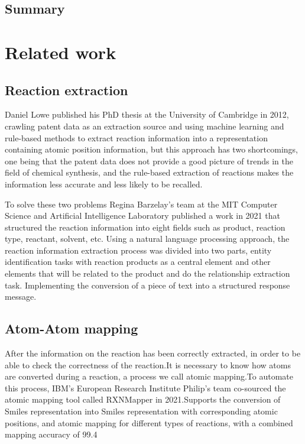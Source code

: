 \documentclass[%
 aip,
 jmp,%
 amsmath,amssymb,
 reprint,%
]{revtex4-2}
\begin{document}
\subsection{Summary}

\section{Related work}

\subsection{Reaction extraction}
Daniel Lowe published his PhD thesis at the University of Cambridge in 2012, crawling patent data as an extraction source and using 
machine learning and rule-based methods to extract reaction information into a representation containing atomic position information, 
but this approach has two shortcomings, one being that the patent data does not provide a good picture of trends in the field of chemical 
synthesis, and the rule-based extraction of reactions makes the information less accurate and less likely to be recalled.

To solve these two problems Regina Barzelay's team at the MIT Computer Science and Artificial Intelligence Laboratory published a work 
in 2021 that structured the reaction information into eight fields such as product, reaction type, reactant, solvent, etc. Using a 
natural language processing approach, the reaction information extraction process was divided into two parts, entity identification tasks
with reaction products as a central element and other elements that will be related to the product and do the relationship extraction task.
Implementing the conversion of a piece of text into a structured response message.


\subsection{Atom-Atom mapping}
After the information on the reaction has been correctly extracted, in order to be able to check the correctness of the reaction.It is necessary
to know how atoms are converted during a reaction, a process we call atomic mapping.To automate this process, IBM's European Research Institute 
Philip's team co-sourced the atomic mapping tool called RXNMapper in 2021.Supports the conversion of Smiles representation into Smiles 
representation with corresponding atomic positions, and atomic mapping for different types of reactions, with a combined mapping accuracy 
of 99.4%
\end{document}
